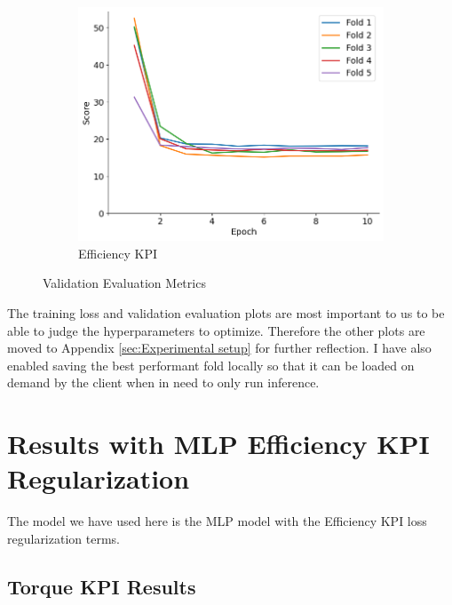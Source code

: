 \documentclass{report} %
\begin{document}
\begin{figure}[H]
    \begin{subfigure}{0.32\textwidth}
        \centering
        \includegraphics[width=\textwidth]{./ReportImages/val_score_y2.png}
        \caption{\centering Efficiency \ac{KPI}}
        \label{fig:Validation Score for Efficiency grid}
    \end{subfigure}
    \caption{Validation Evaluation Metrics}
    \label{fig:Validation Evaluation Metrics}
\end{figure} 

The training loss and validation evaluation plots are most important to us to be able to judge the hyperparameters to optimize. 
Therefore the other plots are moved to Appendix \ref{sec:Experimental setup} for further reflection.
I have also enabled saving the best performant fold locally so that it can be loaded on demand by the client when in need to only run inference.

\section{Results with MLP Efficiency KPI Regularization}\label{sec:Results with MLP Efficiency KPI Regularization}
The model we have used here is the \ac{MLP} model with the Efficiency \ac{KPI} loss regularization terms.
\subsection{Torque KPI Results}\label{subsec:Torque KPI Results with MLP Efficiency KPI Regularization}
\end{document}
